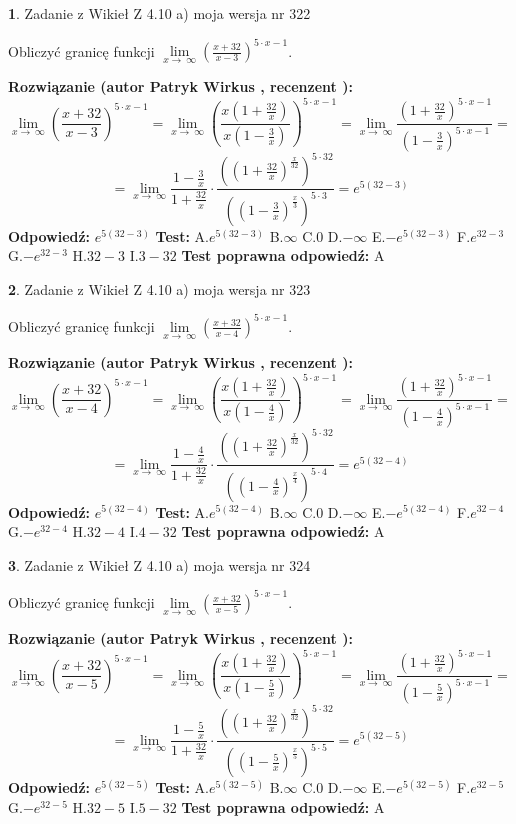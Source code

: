 \documentclass[12pt, a4paper]{article}
\theoremstyle{definition} %
\newtheorem{zad}{}
\newcommand{\zadStart}[1]{\begin{zad}#1\newline}
\newcommand{\zadStop}{\end{zad}}
\newcommand{\rozwStart}[2]{\noindent \textbf{Rozwiązanie (autor #1 , recenzent #2): }\newline}
\newcommand{\rozwStop}{\newline}
\newcommand{\odpStart}{\noindent \textbf{Odpowiedź:}\newline}
\newcommand{\odpStop}{\newline}
\newcommand{\testStart}{\noindent \textbf{Test:}\newline}
\newcommand{\testStop}{\newline}
\newcommand{\kluczStart}{\noindent \textbf{Test poprawna odpowiedź:}\newline}
\newcommand{\kluczStop}{\newline}
\begin{document}
\zadStart{Zadanie z Wikieł Z 4.10 a) moja wersja nr 322}


Obliczyć granicę funkcji  $\lim\limits_{x\to\ \infty}(\frac{x+32}{x-3})^{5\cdot x-1}$.
\zadStop
\rozwStart{Patryk Wirkus}{}
$$\lim\limits_{x\to\ \infty}(\frac{x+32}{x-3})^{5\cdot x-1} = \lim\limits_{x\to\ \infty}(\frac{x(1+\frac{32}{x})}{x(1-\frac{3}{x})})^{5\cdot x-1}=\lim\limits_{x\to\ \infty}\frac{(1+\frac{32}{x})^{5\cdot x-1}}{(1-\frac{3}{x})^{5\cdot x-1}}=$$
$$=\lim\limits_{x\to\ \infty}\frac{1-\frac{3}{x}}{1+\frac{32}{x}}\cdot\frac{((1+\frac{32}{x})^{\frac{x}{32}})^{5\cdot32}}{((1-\frac{3}{x})^{\frac{x}{3}})^{5\cdot3}}=e^{5(32-3)}$$
\rozwStop
\odpStart
$e^{5(32-3)}$
\odpStop
\testStart
A.$e^{5(32-3)}$ B.$\infty$ C.$0$ D.$-\infty$ E.$-e^{5(32-3)}$
F.$e^{32-3}$ G.$-e^{32-3}$
H.$32-3$
I.$3-32$
\testStop
\kluczStart
A
\kluczStop



\zadStart{Zadanie z Wikieł Z 4.10 a) moja wersja nr 323}


Obliczyć granicę funkcji  $\lim\limits_{x\to\ \infty}(\frac{x+32}{x-4})^{5\cdot x-1}$.
\zadStop
\rozwStart{Patryk Wirkus}{}
$$\lim\limits_{x\to\ \infty}(\frac{x+32}{x-4})^{5\cdot x-1} = \lim\limits_{x\to\ \infty}(\frac{x(1+\frac{32}{x})}{x(1-\frac{4}{x})})^{5\cdot x-1}=\lim\limits_{x\to\ \infty}\frac{(1+\frac{32}{x})^{5\cdot x-1}}{(1-\frac{4}{x})^{5\cdot x-1}}=$$
$$=\lim\limits_{x\to\ \infty}\frac{1-\frac{4}{x}}{1+\frac{32}{x}}\cdot\frac{((1+\frac{32}{x})^{\frac{x}{32}})^{5\cdot32}}{((1-\frac{4}{x})^{\frac{x}{4}})^{5\cdot4}}=e^{5(32-4)}$$
\rozwStop
\odpStart
$e^{5(32-4)}$
\odpStop
\testStart
A.$e^{5(32-4)}$ B.$\infty$ C.$0$ D.$-\infty$ E.$-e^{5(32-4)}$
F.$e^{32-4}$ G.$-e^{32-4}$
H.$32-4$
I.$4-32$
\testStop
\kluczStart
A
\kluczStop



\zadStart{Zadanie z Wikieł Z 4.10 a) moja wersja nr 324}


Obliczyć granicę funkcji  $\lim\limits_{x\to\ \infty}(\frac{x+32}{x-5})^{5\cdot x-1}$.
\zadStop
\rozwStart{Patryk Wirkus}{}
$$\lim\limits_{x\to\ \infty}(\frac{x+32}{x-5})^{5\cdot x-1} = \lim\limits_{x\to\ \infty}(\frac{x(1+\frac{32}{x})}{x(1-\frac{5}{x})})^{5\cdot x-1}=\lim\limits_{x\to\ \infty}\frac{(1+\frac{32}{x})^{5\cdot x-1}}{(1-\frac{5}{x})^{5\cdot x-1}}=$$
$$=\lim\limits_{x\to\ \infty}\frac{1-\frac{5}{x}}{1+\frac{32}{x}}\cdot\frac{((1+\frac{32}{x})^{\frac{x}{32}})^{5\cdot32}}{((1-\frac{5}{x})^{\frac{x}{5}})^{5\cdot5}}=e^{5(32-5)}$$
\rozwStop
\odpStart
$e^{5(32-5)}$
\odpStop
\testStart
A.$e^{5(32-5)}$ B.$\infty$ C.$0$ D.$-\infty$ E.$-e^{5(32-5)}$
F.$e^{32-5}$ G.$-e^{32-5}$
H.$32-5$
I.$5-32$
\testStop
\kluczStart
A
\kluczStop
\end{document}
